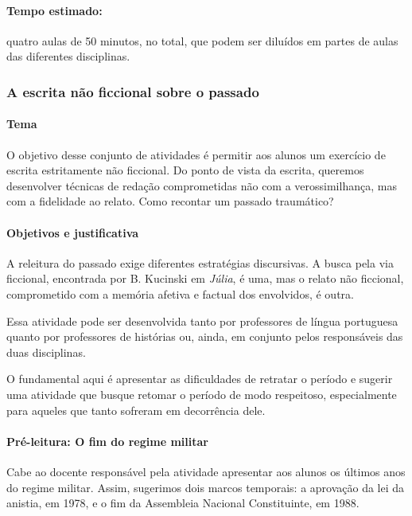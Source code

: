 \documentclass[12pt]{extarticle}
\begin{document}
\paragraph{Tempo estimado:} quatro aulas de 50 minutos, no total, que podem
ser diluídos em partes de aulas das diferentes disciplinas.

\subsubsection{A escrita não ficcional sobre o passado}


\paragraph{Tema}

O objetivo desse conjunto de atividades é permitir aos alunos um
exercício de escrita estritamente não ficcional. Do ponto de vista da
escrita, queremos desenvolver técnicas de redação comprometidas não com
a verossimilhança, mas com a fidelidade ao relato. Como recontar um
passado traumático?

\paragraph{Objetivos e justificativa}

A releitura do passado exige diferentes estratégias discursivas. A busca
pela via ficcional, encontrada por B. Kucinski em \emph{Júlia}, é uma,
mas o relato não ficcional, comprometido com a memória afetiva e factual
dos envolvidos, é outra.

Essa atividade pode ser desenvolvida tanto por professores de língua
portuguesa quanto por professores de histórias ou, ainda, em conjunto
pelos responsáveis das duas disciplinas.

O fundamental aqui é apresentar as dificuldades de retratar o período e
sugerir uma atividade que busque retomar o período de modo respeitoso,
especialmente para aqueles que tanto sofreram em decorrência dele.

\paragraph{Pré-leitura: O fim do regime militar}

Cabe ao docente responsável pela atividade apresentar aos alunos os
últimos anos do regime militar. Assim, sugerimos dois marcos temporais:
a aprovação da lei da anistia, em 1978, e o fim da Assembleia Nacional
Constituinte, em 1988.
\end{document}
